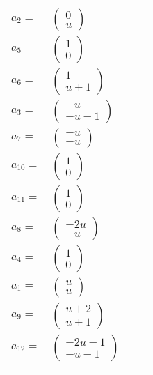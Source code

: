 \documentclass[1p]{elsarticle_modified}
\theoremstyle{definition}
\begin{document}
\begin{tabular}{m{7pt} m{180pt} m{7pt} m{180pt} }
\flushright $a_{2}=$&$\begin{pmatrix}0\\u\end{pmatrix}$ \\
\flushright $a_{5}=$&$\begin{pmatrix}1\\0\end{pmatrix}$ \\
\flushright $a_{6}=$&$\begin{pmatrix}1\\u+1\end{pmatrix}$ \\
\flushright $a_{3}=$&$\begin{pmatrix}- u\\- u-1\end{pmatrix}$ \\
\flushright $a_{7}=$&$\begin{pmatrix}- u\\- u\end{pmatrix}$ \\
\flushright $a_{10}=$&$\begin{pmatrix}1\\0\end{pmatrix}$ \\
\flushright $a_{11}=$&$\begin{pmatrix}1\\0\end{pmatrix}$ \\
\flushright $a_{8}=$&$\begin{pmatrix}-2 u\\- u\end{pmatrix}$ \\
\flushright $a_{4}=$&$\begin{pmatrix}1\\0\end{pmatrix}$ \\
\flushright $a_{1}=$&$\begin{pmatrix}u\\u\end{pmatrix}$ \\
\flushright $a_{9}=$&$\begin{pmatrix}u+2\\u+1\end{pmatrix}$ \\
\flushright $a_{12}=$&$\begin{pmatrix}-2 u-1\\- u-1\end{pmatrix}$\\&\end{tabular}
\end{document}
